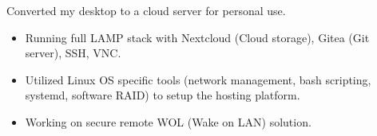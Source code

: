 \documentclass[10pt,a4paper,ragged2e,withhyper]{altacv}
\begin{document}
\begin{paracol}{2}
\divider

Converted my desktop to a cloud server for personal use. 
\medskip
\begin{itemize}
  \item Running full LAMP stack with Nextcloud (Cloud storage), Gitea (Git server), SSH, VNC.
  \item Utilized Linux OS specific tools (network management, bash scripting, systemd, software RAID) to setup the hosting platform.
  \item Working on secure remote WOL (Wake on LAN) solution.
\end{itemize}

\medskip











\switchcolumn






\end{paracol}
\end{document}
